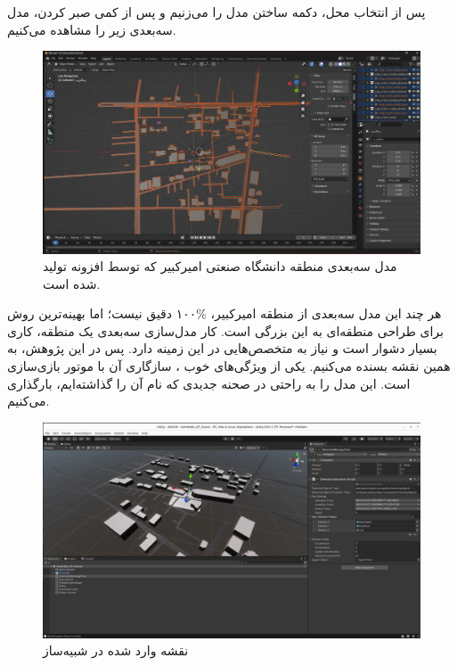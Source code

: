 پس از انتخاب محل، دکمه ساختن مدل را می‌زنیم و پس از کمی صبر کردن، مدل سه‌بعدی زیر را مشاهده می‌کنیم. 
\begin{figure}[h!]
    \centering
    \includegraphics[width=0.9\linewidth]{figures/Amirkabir_Generated_3D_Model.png}
    \caption{مدل سه‌بعدی منطقه دانشگاه صنعتی امیرکبیر که توسط افزونه  تولید شده است.}
    \label{fig:Blosm_OSM}
\end{figure}
هر چند این مدل سه‌بعدی از منطقه امیرکبیر، \%۱۰۰ دقیق نیست؛ اما بهینه‌ترین روش برای طراحی منطقه‌ای به این بزرگی است. کار مدل‌سازی سه‌بعدی یک منطقه، کاری بسیار دشوار است و نیاز به متخصص‌هایی در این زمینه دارد. پس در این پژوهش، به همین نقشه بسنده می‌کنیم.
یکی از ویژگی‌های خوب ، سازگاری آن با موتور بازی‌سازی  است. این مدل را به راحتی در صحنه جدیدی که نام آن را  گذاشته‌ایم، بارگذاری می‌کنیم. 
\begin{figure}[h!]
    \centering
    \includegraphics[width=1\linewidth]{figures/Amirkabir_Map_AWSIM.png}
    \caption{نقشه وارد شده در شبیه‌ساز }
    \label{fig:Amirkabir_Map_AWSIM}
\end{figure}

